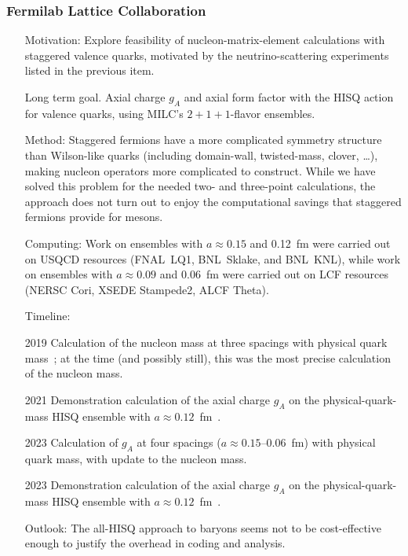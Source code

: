 \documentclass[prd,showpacs,showkeys,preprintnumbers,floatfix,
nofootinbib%
]{revtex4-2}
\begin{document}
\subsubsection{Fermilab Lattice Collaboration}
\begin{itemize}
   \item[Motivation:] Explore feasibility of nucleon-matrix-element calculations with staggered valence quarks, motivated by the neutrino-scattering experiments listed in the previous item.
   \item[Long term goal.] Axial charge $g_A$ and axial form factor with the HISQ action for valence quarks, using MILC's $2+1+1$-flavor ensembles.
   \item[Method:] Staggered fermions have a more complicated symmetry structure than Wilson-like quarks (including domain-wall, twisted-mass, clover, \ldots), making nucleon operators more complicated to construct.  While we have solved this problem for the needed two- and three-point calculations, the approach does not turn out to enjoy the computational savings that staggered fermions provide for mesons.
    \item[Computing:] Work on ensembles with $a\approx0.15$ and 0.12~fm were carried out on USQCD resources (FNAL~LQ1, BNL~Sklake, and BNL~KNL), while work on ensembles with $a\approx0.09$ and 0.06~fm were carried out on LCF resources (NERSC Cori, XSEDE Stampede2, ALCF Theta).
\item[Timeline:]
   \item[2019] Calculation of the nucleon mass at three spacings with physical quark mass~\cite{Lin:2019pia}; at the time (and possibly still), this was the most precise calculation of the nucleon mass.
   \item[2021] Demonstration calculation of the axial charge $g_A$ on the physical-quark-mass HISQ ensemble with $a\approx0.12$~fm~\cite{Lin:2020wko}.
   \item[2023] Calculation of $g_A$ at four spacings ($a\approx0.15$--0.06~fm) with physical quark mass, with update to the nucleon mass.
   \item[2023] Demonstration calculation of the axial charge $g_A$ on the physical-quark-mass HISQ ensemble with $a\approx0.12$~fm~\cite{Lin:2020wko}.
\item[Outlook:] The all-HISQ approach to baryons seems not to be cost-effective enough to justify the overhead in coding and analysis.
\end{itemize}
\end{document}
